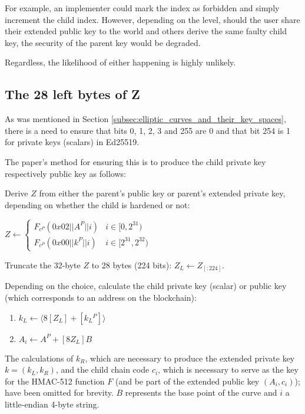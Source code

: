 \documentclass[12pt, a4paper, twocolumn]{article}
\begin{document}
For example, an implementer could mark the index as forbidden and simply increment the child index. However, depending on the level, should the user share their extended public key to the world and others derive the same faulty child key, the security of the parent key would be degraded.

Regardless, the likelihood of either happening is highly unlikely.

\subsection{The 28 left bytes of Z}
\label{subsec:the_28_left_bytes_of_z}

As was mentioned in Section \ref{subsec:elliptic_curves_and_their_key_spaces}, there is a need to ensure that bits 0, 1, 2, 3 and 255 are 0 and that bit 254 is 1 for private keys (scalars) in Ed25519.

The paper's method for ensuring this is to produce the child private key respectively public key as follows:

Derive $Z$ from either the parent's public key or parent's extended private key, depending on whether the child is hardened or not:

$  Z \leftarrow 
  \begin{cases} 
  F_{c^P}(0x02||A^P||i) & i \in  [0, 2^{31}) \\
  F_{c^P}(0x00||k^P||i) & i \in [2^{31}, 2^{32})
  \end{cases}
  $

Truncate the 32-byte $Z$ to 28 bytes (224 bits): $Z_L \leftarrow Z_{[:224]}$.

Depending on the choice, calculate the child private key (scalar) or public key (which corresponds to an address on the blockchain):

\begin{enumerate}[label={}] 
  \item $k_L \leftarrow \langle 8[Z_L]  + [k{_L}^P]\rangle$ 
  \item $A_i \leftarrow A^P + [8Z_L]B$
\end{enumerate}


The calculations of $k_R$, which are necessary to produce the extended private key $k = (k_L, k_R)$, and the child chain code $c_i$, which is necessary to serve as the key for the HMAC-512 function $F$ (and be part of the extended public key $(A_i, c_i)$); have been omitted for brevity. $B$ represents the base point of the curve and $i$ a little-endian 4-byte string.
\end{document}
